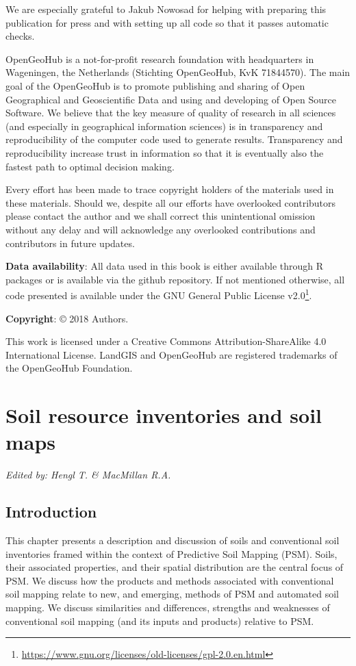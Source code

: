 \documentclass[graybox,natbib,nospthms,UStrade]{svmono}
\renewcommand{\href}[2]{#2 (\url{#1})}
\renewcommand{\href}[2]{#2\footnote{\url{#1}}}
\begin{document}
We are especially grateful to Jakub Nowosad for helping with preparing this publication for press and with setting up all code so that it passes automatic checks.

OpenGeoHub is a not-for-profit research foundation with headquarters in Wageningen, the Netherlands (Stichting OpenGeoHub, KvK 71844570). The main goal of the OpenGeoHub is to promote publishing and sharing of Open Geographical and Geoscientific Data and using and developing of Open Source Software. We believe that the key measure of quality of research in all sciences (and especially in geographical information sciences) is in transparency and reproducibility of the computer code used to generate results. Transparency and reproducibility increase trust in information so that it is eventually also the fastest path to optimal decision making.

Every effort has been made to trace copyright holders of the materials used in these materials. Should we, despite all our efforts have overlooked contributors please contact the author and we shall correct this unintentional omission without any delay and will acknowledge any overlooked contributions and contributors in future updates.

\textbf{Data availability}: All data used in this book is either available through R packages or is available via the github repository. If not mentioned otherwise, all code presented is available under the \href{https://www.gnu.org/licenses/old-licenses/gpl-2.0.en.html}{GNU General Public License v2.0}.

\textbf{Copyright}: © 2018 Authors.

This work is licensed under a Creative Commons Attribution-ShareAlike 4.0 International License. LandGIS and OpenGeoHub are registered trademarks of the OpenGeoHub Foundation.

\hypertarget{introduction}{%
\chapter{Soil resource inventories and soil maps}\label{introduction}}

\emph{Edited by: Hengl T. \& MacMillan R.A.}

\hypertarget{introduction-1}{%
\section{Introduction}\label{introduction-1}}

This chapter presents a description and discussion of soils and
conventional soil inventories framed within the context of Predictive Soil Mapping (PSM). Soils,
their associated properties, and their spatial distribution are the
central focus of PSM. We discuss how the products and
methods associated with conventional soil mapping relate to new, and
emerging, methods of PSM and automated soil mapping. We discuss similarities and
differences, strengths and weaknesses of conventional soil mapping (and
its inputs and products) relative to PSM.
\end{document}
